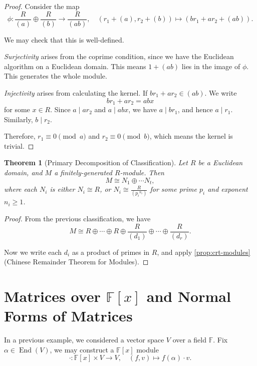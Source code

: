 \documentclass{article}
\newtheorem{theorem}{Theorem}[section]
\theoremstyle{definition}
\theoremstyle{remark}
\newcommand{\pqty}[1]{\left(#1\right)}
\newcommand{\bqty}[1]{\left[#1\right]}
\newcommand{\flatfrac}[2]{\frac{#1}{#2}}
\newcommand{\function}[5]{#1:#2\to #3,\quad #4\mapsto #5}
\newcommand{\isomorphic}{\cong}
\newcommand{\divides}{\mid}
\newcommand{\FF}{\mathbb{F}}
\newcommand{\End}{\operatorname{End}}
\begin{document}
\begin{proof}
    Consider the map
    \[
        \function{\phi}{\flatfrac{R}{\pqty{a}} \oplus \flatfrac{R}{\pqty{b}}}{\flatfrac{R}{\pqty{ab}}}{\pqty{r_1 + \pqty{a}, r_2 + \pqty{b}}}{\pqty{b r_1 + a r_2 + \pqty{ab}}.}
    \]

    We may check that this is well-defined.

    \emph{Surjectivity} arises from the coprime condition, since we have the Euclidean algorithm on a Euclidean domain. This means \(1 + \pqty{ab}\) lies in the image of \(\phi\). This generates the whole module.

    \emph{Injectivity} arises from calculating the kernel. If \(b r_1 + a r_2 \in \pqty{ab}\). We write
    \[
        b r_1 + a r_2 = a b x
    \]
    for some \(x \in R\). Since \(a \divides a r_2\) and \(a \divides a b x\), we have \(a \divides b r_1\), and hence \(a \divides r_1\). Similarly, \(b \divides r_2\).

    Therefore, \(r_1 \equiv 0 \pmod a\) and \(r_2 \equiv 0 \pmod b\), which means the kernel is trivial.
\end{proof}

\begin{theorem}[Primary Decomposition of Classification]
    \label{thm:primary-decomposition-classification}%
    Let \(R\) be a Euclidean domain, and \(M\) a finitely-generated \(R\)-module. Then
    \[
        M \isomorphic N_1 \oplus \cdots N_t,
    \]
    where each \(N_i\) is either \(N_i \isomorphic R\), or \(N_i \isomorphic \flatfrac{R}{\pqty{{p_i}^{n_i}}}\) for some prime \(p_i\) and exponent \(n_i \geq 1\).
\end{theorem}

\begin{proof}
    From the previous classification, we have
    \[
        M \isomorphic R \oplus \cdots \oplus R \oplus \flatfrac{R}{\pqty{d_1}} \oplus \cdots \oplus \flatfrac{R}{\pqty{d_r}}.
    \]

    Now we write each \(d_i\) as a product of primes in \(R\), and apply \autoref{prop:crt-modules} (Chinese Remainder Theorem for Modules).
\end{proof}

\section{Matrices over \(\FF\bqty{x}\) and Normal Forms of Matrices}

In a previous example, we considered a vector space \(V\) over a field \(\FF\). Fix \(\alpha \in \End\pqty{V}\), we may construct a \(\FF\bqty{x}\) module
\[
    \function{\cdot}{\FF\bqty{x} \times V}{V}{\pqty{f, v}}{f\pqty{\alpha} \cdot v.}
\]
\end{document}
